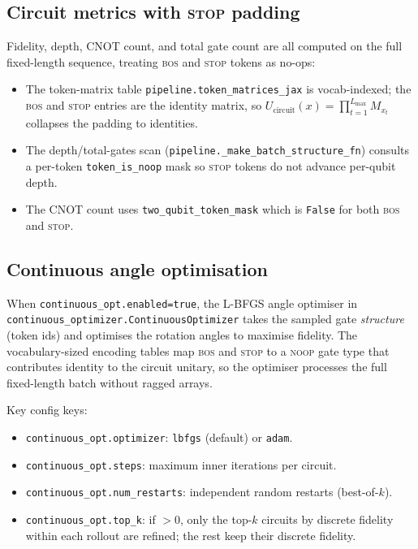 \documentclass[11pt]{article}
\newcommand{\Lmax}{L_{\max}}
\begin{document}
\subsection{Circuit metrics with \textsc{stop} padding}

Fidelity, depth, CNOT count, and total gate count are all computed on the
full fixed-length sequence, treating \textsc{bos} and \textsc{stop} tokens
as no-ops:
\begin{itemize}[leftmargin=1.5em]
  \item The token-matrix table \texttt{pipeline.token\_matrices\_jax} is
  vocab-indexed; the \textsc{bos} and \textsc{stop} entries are the identity
  matrix, so $U_{\mathrm{circuit}}(x) = \prod_{t=1}^{\Lmax} M_{x_t}$
  collapses the padding to identities.
  \item The depth/total-gates scan (\texttt{pipeline.\_make\_batch\_structure\_fn})
  consults a per-token \texttt{token\_is\_noop} mask so \textsc{stop} tokens
  do not advance per-qubit depth.
  \item The CNOT count uses \texttt{two\_qubit\_token\_mask} which is
  \texttt{False} for both \textsc{bos} and \textsc{stop}.
\end{itemize}

\subsection{Continuous angle optimisation}
\label{sec:contopt}

When \texttt{continuous\_opt.enabled=true}, the L-BFGS angle optimiser in
\texttt{continuous\_optimizer.ContinuousOptimizer} takes the sampled gate
\emph{structure} (token ids) and optimises the rotation angles to maximise
fidelity. The vocabulary-sized encoding tables map \textsc{bos} and
\textsc{stop} to a \textsc{noop} gate type that contributes identity to the
circuit unitary, so the optimiser processes the full fixed-length batch
without ragged arrays.

Key config keys:
\begin{itemize}[leftmargin=1.5em]
  \item \texttt{continuous\_opt.optimizer}: \texttt{lbfgs} (default) or
  \texttt{adam}.
  \item \texttt{continuous\_opt.steps}: maximum inner iterations per circuit.
  \item \texttt{continuous\_opt.num\_restarts}: independent random restarts
  (best-of-$k$).
  \item \texttt{continuous\_opt.top\_k}: if $>0$, only the top-$k$ circuits
  by discrete fidelity within each rollout are refined; the rest keep their
  discrete fidelity.
\end{itemize}
\end{document}
